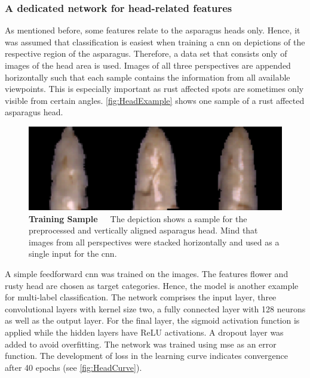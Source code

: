 \subsubsection{A dedicated network for head-related features}
\label{subsec:HeadNetwork}

As mentioned before, some features relate to the asparagus heads only. Hence, it was assumed that classification is easiest when training a \acrshort{cnn} on depictions of the respective region of the asparagus. Therefore, a data set that consists only of images of the head area is used. Images of all three perspectives are appended horizontally such that each sample contains the information from all available viewpoints. This is especially important as rust affected spots are sometimes only visible from certain angles. \autoref{fig:HeadExample} shows one sample of a rust affected asparagus head.

\begin{figure}[!htb]
	\centering
	\includegraphics[scale=0.4]{Figures/chapter04/head_example.png}
	\decoRule
	\caption[Head Features CNN Training Sample]{\textbf{Training Sample}~~~The depiction shows a sample for the preprocessed and vertically aligned asparagus head. Mind that images from all perspectives were stacked horizontally and used as a single input for the \acrshort{cnn}.}
	\label{fig:HeadExample}
\end{figure}

\bigskip
A simple feedforward \acrshort{cnn} was trained on the images. The features flower and rusty head are chosen as target categories. Hence, the  model is another example for multi-label classification. The network comprises the input layer, three convolutional layers with kernel size two, a fully connected layer with 128 neurons as well as the output layer. For the final layer, the sigmoid activation function is applied while the hidden layers have ReLU activations. A dropout layer was added to avoid overfitting. The network was trained using \acrfull{mse} as an error function. The development of loss in the learning curve indicates convergence after 40 epochs (see \autoref{fig:HeadCurve}).

